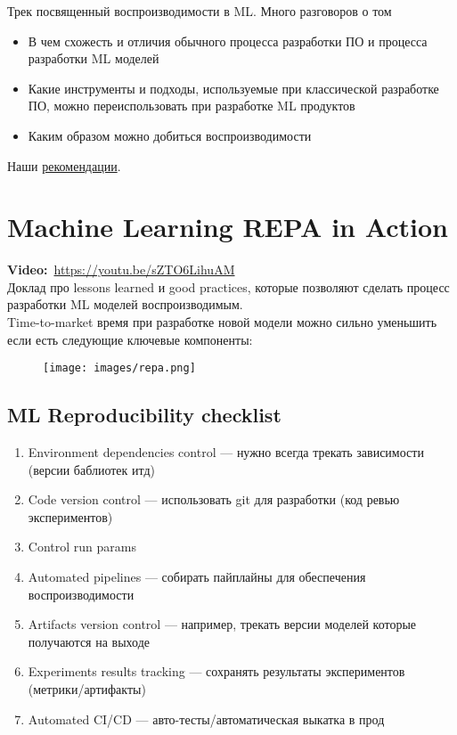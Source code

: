 Трек посвященный воспроизводимости в ML. 
Много разговоров о том
\begin{itemize}
    \item В чем схожесть и отличия обычного процесса разработки ПО и процесса разработки ML моделей
    \item Какие инструменты и подходы, используемые при классической разработке ПО, можно переиспользовать при разработке ML продуктов
    \item Каким образом можно добиться воспроизводимости
\end{itemize}

\begin{remark}
    Наши \href{https://paper.dropbox.com/doc/Reproducible-Research-Draft--A7_r_i5_5DxZO4k9GQMzGWu3AQ-AfvEwFDcTF6lG0nWrdPWj}{рекомендации}.
\end{remark}

\section{Machine Learning REPA in Action}

\textbf{Video:}~\url{https://youtu.be/sZTO6LihuAM} \\

Доклад про lessons learned и good practices, которые позволяют сделать процесс разработки ML моделей воспроизводимым. \\

Time-to-market время при разработке новой модели можно сильно уменьшить если есть следующие ключевые компоненты:
\begin{figure}[ht]
    \centering
    \texttt{[image: images/repa.png]}
\end{figure}

\subsection{ML Reproducibility checklist}

\begin{enumerate}
    \item Environment dependencies control --- нужно всегда трекать зависимости (версии баблиотек итд)
    \item Code version control --- использовать git для разработки (код ревью экспериментов)
    \item Control run params
    \item Automated pipelines --- собирать пайплайны для обеспечения воспроизводимости
    \item Artifacts version control --- например, трекать версии моделей которые получаются на выходе
    \item Experiments results tracking --- сохранять результаты экспериментов (метрики/артифакты)
    \item Automated CI/CD --- авто-тесты/автоматическая выкатка в прод
\end{enumerate}

